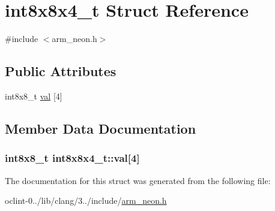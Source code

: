 \hypertarget{structint8x8x4__t}{\section{int8x8x4\-\_\-t Struct Reference}
\label{structint8x8x4__t}
}


{\ttfamily \#include $<$arm\-\_\-neon.\-h$>$}

\subsection*{Public Attributes}
\begin{DoxyCompactItemize}
\item 
int8x8\-\_\-t \hyperlink{structint8x8x4__t_ad93cef6514eed1af5bb4662303eb7129}{val} \mbox{[}4\mbox{]}
\end{DoxyCompactItemize}


\subsection{Member Data Documentation}
\hypertarget{structint8x8x4__t_ad93cef6514eed1af5bb4662303eb7129}{
\subsubsection[{val}]{\setlength{\rightskip}{0pt plus 5cm}int8x8\-\_\-t int8x8x4\-\_\-t\-::val\mbox{[}4\mbox{]}}}\label{structint8x8x4__t_ad93cef6514eed1af5bb4662303eb7129}


The documentation for this struct was generated from the following file\-:\begin{DoxyCompactItemize}
\item 
oclint-\/0../lib/clang/3../include/\hyperlink{arm__neon_8h}{arm\-\_\-neon.\-h}\end{DoxyCompactItemize}
